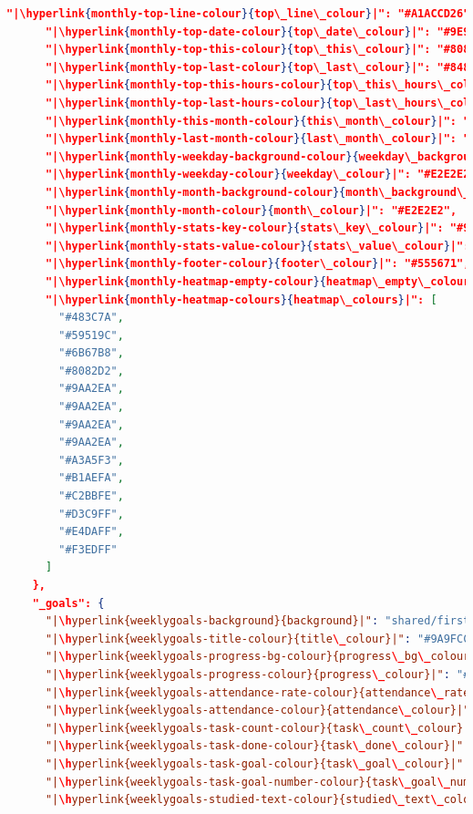\documentclass[a4paper, 10pt]{report}
\begin{document}
\begin{lstlisting}[language=json,firstnumber=1]
      "|\hyperlink{monthly-top-line-colour}{top\_line\_colour}|": "#A1ACCD26",
      "|\hyperlink{monthly-top-date-colour}{top\_date\_colour}|": "#9E9F9F",
      "|\hyperlink{monthly-top-this-colour}{top\_this\_colour}|": "#8081BE",
      "|\hyperlink{monthly-top-last-colour}{top\_last\_colour}|": "#8487A073",
      "|\hyperlink{monthly-top-this-hours-colour}{top\_this\_hours\_colour}|": "#8081BE",
      "|\hyperlink{monthly-top-last-hours-colour}{top\_last\_hours\_colour}|": "#E3E2F1",
      "|\hyperlink{monthly-this-month-colour}{this\_month\_colour}|": "#8F8F8F",
      "|\hyperlink{monthly-last-month-colour}{last\_month\_colour}|": "#8F8F8F",
      "|\hyperlink{monthly-weekday-background-colour}{weekday\_background\_colour}|": "#4B55A5",
      "|\hyperlink{monthly-weekday-colour}{weekday\_colour}|": "#E2E2E2",
      "|\hyperlink{monthly-month-background-colour}{month\_background\_colour}|": "#4B55A5",
      "|\hyperlink{monthly-month-colour}{month\_colour}|": "#E2E2E2",
      "|\hyperlink{monthly-stats-key-colour}{stats\_key\_colour}|": "#9E9E9E",
      "|\hyperlink{monthly-stats-value-colour}{stats\_value\_colour}|": "#9E9E9E",
      "|\hyperlink{monthly-footer-colour}{footer\_colour}|": "#555671",
      "|\hyperlink{monthly-heatmap-empty-colour}{heatmap\_empty\_colour}|": "#323233",
      "|\hyperlink{monthly-heatmap-colours}{heatmap\_colours}|": [
        "#483C7A",
        "#59519C",
        "#6B67B8",
        "#8082D2",
        "#9AA2EA",
        "#9AA2EA",
        "#9AA2EA",
        "#9AA2EA",
        "#A3A5F3",
        "#B1AEFA",
        "#C2BBFE",
        "#D3C9FF",
        "#E4DAFF",
        "#F3EDFF"
      ]
    },
    "_goals": {
      "|\hyperlink{weeklygoals-background}{background}|": "shared/first_page_background.png",
      "|\hyperlink{weeklygoals-title-colour}{title\_colour}|": "#9A9FCC",
      "|\hyperlink{weeklygoals-progress-bg-colour}{progress\_bg\_colour}|": "#9A9FCC40",
      "|\hyperlink{weeklygoals-progress-colour}{progress\_colour}|": "#8B9ACD",
      "|\hyperlink{weeklygoals-attendance-rate-colour}{attendance\_rate\_colour}|": "#9A9FCC",
      "|\hyperlink{weeklygoals-attendance-colour}{attendance\_colour}|": "#9E9E9E",
      "|\hyperlink{weeklygoals-task-count-colour}{task\_count\_colour}|": "#9A9FCC",
      "|\hyperlink{weeklygoals-task-done-colour}{task\_done\_colour}|": "#9E9E9E",
      "|\hyperlink{weeklygoals-task-goal-colour}{task\_goal\_colour}|": "#9E9E9E",
      "|\hyperlink{weeklygoals-task-goal-number-colour}{task\_goal\_number\_colour}|": "#9E9E9E",
      "|\hyperlink{weeklygoals-studied-text-colour}{studied\_text\_colour}|": "#9E9E9E",

\end{lstlisting}
\end{document}
